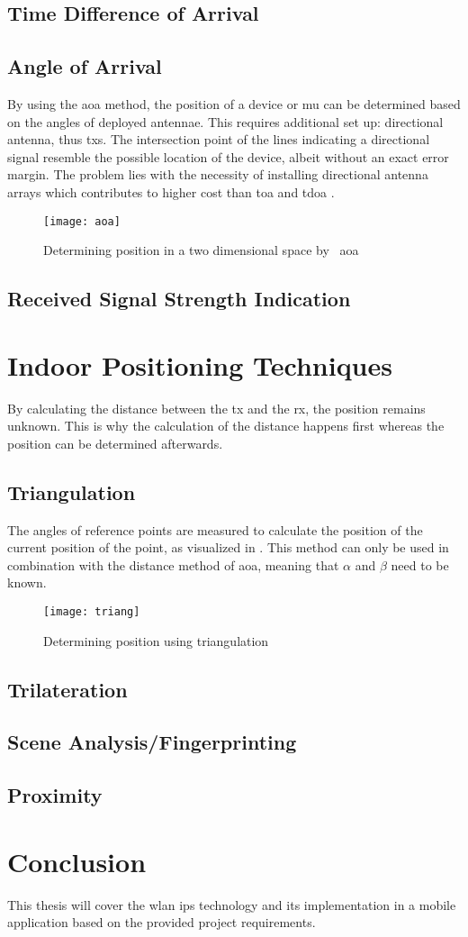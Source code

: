 \subsection{Time Difference of Arrival}
\subsection{Angle of Arrival}
By using the \acrfull{aoa} method, the position of a device or \acrlong{mu} can be determined based on the angles of deployed antennae. This requires additional set up: directional antenna, thus \acrlong{tx}s. The intersection point of the lines indicating a directional signal resemble the possible location of the device, albeit without an exact error margin. The problem lies with the necessity of installing directional antenna arrays which contributes to higher cost than \acrlong{toa} and \acrlong{tdoa} \cite{Jindal}.
\begin{figure}[h!]
\centering
\texttt{[image: aoa]}
\caption{Determining position in a two dimensional space by ~\acrlong{aoa}~\cite{Jindal}}
\label{fig:aoa}
\end{figure}
\subsection{Received Signal Strength Indication}
\section{Indoor Positioning Techniques}
By calculating the distance between the \acrshort{tx} and the \acrshort{rx}, the position remains unknown. This is why the calculation of the distance happens first whereas the position can be determined afterwards.
\subsection{Triangulation}
The angles of reference points are measured to calculate the position of the current position of the point, as visualized in \cite{fig:triang}. This method can only be used in combination with the distance method of \acrlong{aoa}, meaning that $\alpha$ and $\beta$ need to be known.
\begin{figure}[h!]
\centering
\texttt{[image: triang]}
\caption{Determining position using triangulation ~\cite{Loy2018}}
\label{fig:triang}
\end{figure}
\subsection{Trilateration}
\subsection{Scene Analysis/Fingerprinting}
\subsection{Proximity}
\section{Conclusion}
This thesis will cover the \acrshort{wlan} \acrlong{ips} technology and its implementation in a mobile application based on the provided project requirements.
